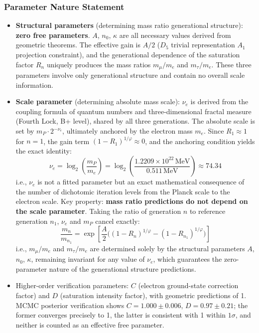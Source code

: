 \documentclass[12pt,a4paper,twocolumn]{article}
\renewcommand{\phi}{\varphi}
\begin{document}
\subsubsection{Parameter Nature Statement}
\begin{itemize}
\item \textbf{Structural parameters} (determining mass ratio generational structure): \textbf{zero free parameters}. $A$, $n_0$, $\kappa$ are all necessary values derived from geometric theorems. The effective gain is $A/2$ ($D_5$ trivial representation $A_1$ projection constraint), and the generational dependence of the saturation factor $R_n$ uniquely produces the mass ratios $m_\mu/m_e$ and $m_\tau/m_e$. These three parameters involve only generational structure and contain no overall scale information.
\item \textbf{Scale parameter} (determining absolute mass scale): $\nu_e$ is derived from the coupling formula of quantum numbers and three-dimensional fractal measure (Fourth Lock, B+ level), shared by all three generations. The absolute scale is set by $m_P \cdot 2^{-\nu_e}$, ultimately anchored by the electron mass $m_e$. Since $R_1\approx 1$ for $n=1$, the gain term $(1-R_1)^{1/\phi}\approx 0$, and the anchoring condition yields the exact identity:
\[
\nu_e = \log_2\!\left(\frac{m_P}{m_e}\right) = \log_2\!\left(\frac{1.2209\times 10^{22}\,\text{MeV}}{0.511\,\text{MeV}}\right) \approx 74.34
\]
i.e., $\nu_e$ is not a fitted parameter but an exact mathematical consequence of the number of dichotomic iteration levels from the Planck scale to the electron scale. Key property: \textbf{mass ratio predictions do not depend on the scale parameter}. Taking the ratio of generation $n$ to reference generation $n_1$, $\nu_e$ and $m_P$ cancel exactly:
\[
\frac{m_n}{m_{n_1}} = \exp\!\left[\frac{A}{2}\Big((1-R_n)^{1/\phi} - (1-R_{n_1})^{1/\phi}\Big)\right]
\]
i.e., $m_\mu/m_e$ and $m_\tau/m_e$ are determined solely by the structural parameters $A$, $n_0$, $\kappa$, remaining invariant for any value of $\nu_e$, which guarantees the zero-parameter nature of the generational structure predictions.
\item Higher-order verification parameters: $C$ (electron ground-state correction factor) and $D$ (saturation intensity factor), with geometric predictions of 1. MCMC posterior verification shows $C=1.000\pm0.006$, $D=0.97\pm0.21$; the former converges precisely to 1, the latter is consistent with 1 within $1\sigma$, and neither is counted as an effective free parameter.
\end{itemize}
\end{document}
